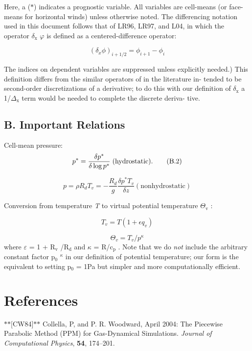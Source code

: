 Here, a ($\ast$) indicates a prognostic variable. All variables are cell-\/means (or face-\/means for horizontal winds) unless otherwise noted. The differencing notation used in this document follows that of L\-R96, L\-R97, and L04, in which the operator {$\delta$}$_{\mbox{x}}$  {$\varphi$} is defined as a centered-\/difference operator\-:

\[ (\delta_x \phi)_{i+1/2} = \phi_{i+1} - \phi_i \tag {B.1} \]

The indices on dependent variables are suppressed unless explicitly needed.) This definition differs from the similar operators of in the literature in-\/ tended to be second-\/order discretizations of a derivative; to do this with our definition of {$\delta$}$_{\mbox{x}}$  a 1/{$\Delta$}$_{\mbox{x}}$  term would be needed to complete the discrete deriva-\/ tive. 



\subsection*{B. Important Relations}

Cell-\/mean pressure\-: \[ p^* = \frac{\delta p^*}{\delta \log p^*} \; \mathrm{(hydrostatic)} \\. \tag {B.2} \]

\[ p = \rho R_d T_v = - \frac{R_d}{g} \frac{\delta p^* T_v}{\delta z} \mathrm{(nonhydrostatic)} \tag {B.3} \]

Conversion from temperature {\itshape T} to virtual potential temperature {$\Theta$}$_{\mbox{v}}$  \-:

\[ T_v = T \left ( 1 + \epsilon q_v \right ) \tag {B.4} \]

\[ \Theta_v = T_v / p^\kappa \tag {B.5} \] where {$\varepsilon$} = 1 + R$_{\mbox{v}}$ /\-R$_{\mbox{d}}$  and {$\kappa$} = R/c$_{\mbox{p}}$ . Note that we do {\itshape not} include the arbitrary constant factor p$_{\mbox{0}}$ $^{\mbox{{$\kappa$}}}$  in our definition of potential temperature; our form is the equivalent to setting p$_{\mbox{0}}$  = 1\-Pa but simpler and more computationally efficient. \hypertarget{references}{}\section{References}\label{references}
$\ast$$\ast$\mbox{[}C\-W84\mbox{]}$\ast$$\ast$ Collella, P, and P. R. Woodward, April 2004\-: The Piecewise Parabolic Method (P\-P\-M) for Gas-\/\-Dynamical Simulations. {\itshape Journal of Computational Physics}, {\bfseries 54}, 174--201.

